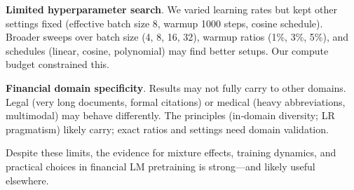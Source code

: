 \textbf{Limited hyperparameter search}. We varied learning rates but kept other settings fixed (effective batch size 8, warmup 1000 steps, cosine schedule). Broader sweeps over batch size (4, 8, 16, 32), warmup ratios (1\%, 3\%, 5\%), and schedules (linear, cosine, polynomial) may find better setups. Our compute budget constrained this.

\textbf{Financial domain specificity}. Results may not fully carry to other domains. Legal (very long documents, formal citations) or medical (heavy abbreviations, multimodal) may behave differently. The principles (in‑domain diversity; LR pragmatism) likely carry; exact ratios and settings need domain validation.

Despite these limits, the evidence for mixture effects, training dynamics, and practical choices in financial LM pretraining is strong—and likely useful elsewhere.
